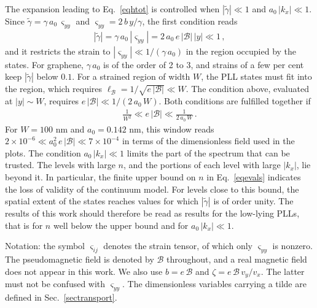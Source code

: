\documentclass[aps,prb, onecolumn, nofootinbib, citeautoscript,10pt]{revtex4-2}
\begin{document}
The expansion leading to Eq.~\eqref{eqhtot} is controlled when $|\tilde\gamma|\ll1$ and $a_0\,|k_x|\ll1$. Since $\tilde\gamma=\gamma\,a_0\,\varsigma_{yy}$ and $\varsigma_{yy}=2\,b\,y/\gamma$, the first condition reads
\begin{align}
|\tilde\gamma|=\gamma\,a_0\,|\varsigma_{yy}|=2\,a_0\,e\,|\mathcal B|\,|y|\ll1\,,
\end{align}
and it restricts the strain to $|\varsigma_{yy}|\ll1/(\gamma\,a_0)$ in the region occupied by the states. For graphene, $\gamma\,a_0$ is of the order of 2 to 3, and strains of a few per cent keep $|\tilde\gamma|$ below $0.1$. For a strained region of width $W$, the PLL states must fit into the region, which requires $\ell_{\mathcal B}=1/\sqrt{e\,|\mathcal B|}\ll W$. The condition above, evaluated at $|y|\sim W$, requires $e\,|\mathcal B|\ll1/(2\,a_0\,W)$. Both conditions are fulfilled together if
\begin{align}
\frac{1}{W^2}\ll e\,|\mathcal B|\ll\frac{1}{2\,a_0\,W}\,.
\end{align}
For $W=100$ nm and $a_0=0.142$ nm, this window reads $2\times10^{-6}\ll a_0^2\,e\,|\mathcal B|\ll7\times10^{-4}$ in terms of the dimensionless field used in the plots. The condition $a_0\,|k_x|\ll1$ limits the part of the spectrum that can be trusted. The levels with large $n$, and the portions of each level with large $|k_x|$, lie beyond it. In particular, the finite upper bound on $n$ in Eq.~\eqref{eqevals} indicates the loss of validity of the continuum model. For levels close to this bound, the spatial extent of the states reaches values for which $|\tilde\gamma|$ is of order unity. The results of this work should therefore be read as results for the low-lying PLLs, that is for $n$ well below the upper bound and for $a_0\,|k_x|\ll1$.



Notation: the symbol $\varsigma_{ij}$ denotes the strain tensor, of which only $\varsigma_{yy}$ is nonzero. The pseudomagnetic field is denoted by $\mathcal B$ throughout, and a real magnetic field does not appear in this work. We also use $b=e\,\mathcal B$ and $\zeta=e\,\mathcal B\,v_y/v_x$. The latter must not be confused with $\varsigma_{yy}$. The dimensionless variables carrying a tilde are defined in Sec.~\ref{sectransport}.
\end{document}
